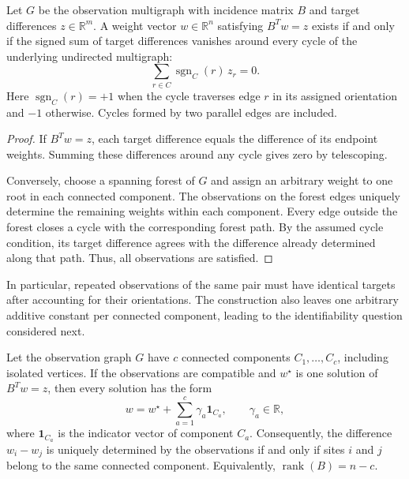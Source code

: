 \begin{proposition}
\label{prop:cycle-compatibility}
Let $G$ be the observation multigraph with incidence matrix $B$ and target differences $z\in\mathbb R^m$. A weight vector $w\in\mathbb R^n$ satisfying $B^Tw=z$ exists if and only if the signed sum of target differences vanishes around every cycle of the underlying undirected multigraph:
\begin{equation}
\sum_{r\in C}\operatorname{sgn}_C(r)\,z_r=0.
\label{eq:cycle-sum}
\end{equation}
Here $\operatorname{sgn}_C(r)=+1$ when the cycle traverses edge $r$ in its assigned orientation and $-1$ otherwise. Cycles formed by two parallel edges are included.
\end{proposition}

\begin{proof}
If $B^Tw=z$, each target difference equals the difference of its endpoint weights. Summing these differences around any cycle gives zero by telescoping.

Conversely, choose a spanning forest of $G$ and assign an arbitrary weight to one root in each connected component. The observations on the forest edges uniquely determine the remaining weights within each component. Every edge outside the forest closes a cycle with the corresponding forest path. By the assumed cycle condition, its target difference agrees with the difference already determined along that path. Thus, all observations are satisfied.
\end{proof}

In particular, repeated observations of the same pair must have identical targets after accounting for their orientations. The construction also leaves one arbitrary additive constant per connected component, leading to the identifiability question considered next.

\begin{corollary}[Identifiability]
\label{cor:observation-identifiability}
Let the observation graph $G$ have $c$ connected components $C_1,\ldots,C_c$, including isolated vertices. If the observations are compatible and $w^\star$ is one solution of $B^Tw=z$, then every solution has the form
\begin{equation}
w=w^\star+\sum_{a=1}^{c}\gamma_a\mathbf{1}_{C_a},
\qquad \gamma_a\in\mathbb R,
\label{eq:component-gauge}
\end{equation}
where $\mathbf{1}_{C_a}$ is the indicator vector of component $C_a$. Consequently, the difference $w_i-w_j$ is uniquely determined by the observations if and only if sites $i$ and $j$ belong to the same connected component. Equivalently, $\operatorname{rank}(B)=n-c$.
\end{corollary}

